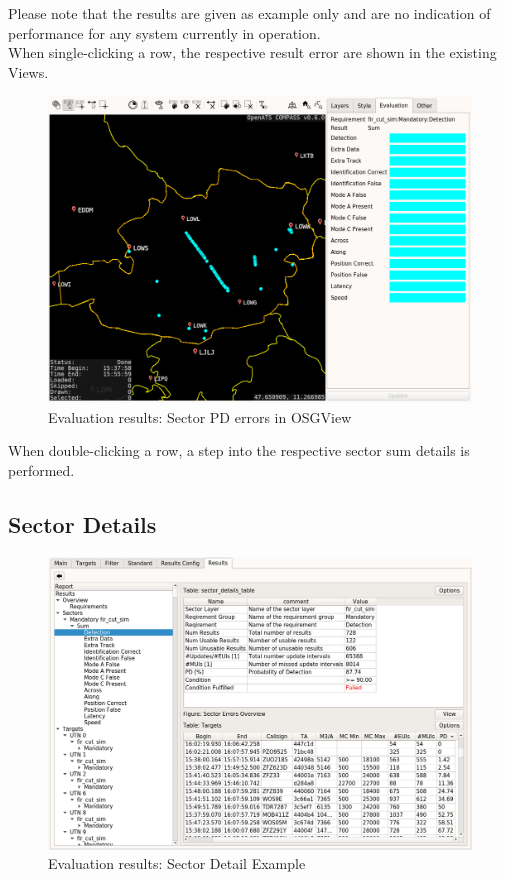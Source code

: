 Please note that the results are given as example only and are no indication of performance for any system currently in operation. \\

When single-clicking a row, the respective result error are shown in the existing Views.

\begin{figure}[H]
  \hspace*{-2.5cm}
    \includegraphics[width=19cm,frame]{figures/eval_results_pd_sum_osgview.png}
  \caption{Evaluation results: Sector PD errors in OSGView}
\end{figure}

When double-clicking a row, a step into the respective sector sum details is performed.

\subsection{Sector Details}

\begin{figure}[H]
  \hspace*{-2cm}
    \includegraphics[width=18cm,frame]{figures/eval_results_sec_det_example.png}
  \caption{Evaluation results: Sector Detail Example}
\end{figure}

